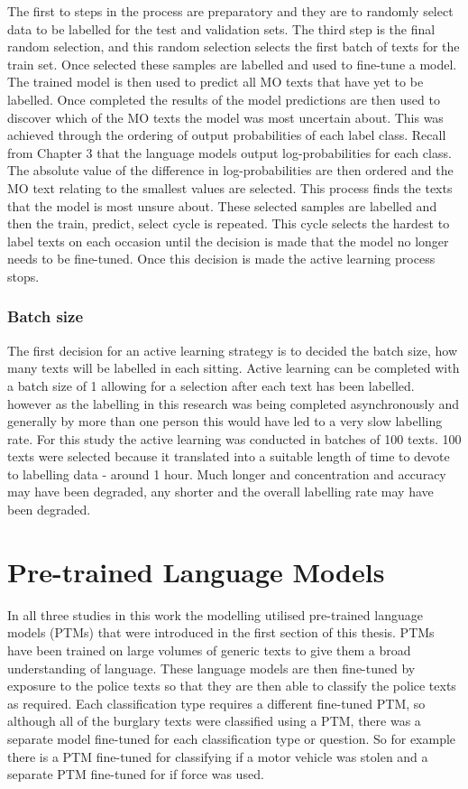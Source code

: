The first to steps in the process are preparatory and they are to randomly select data to be labelled for the test and validation sets. The third step is the final random selection, and this random selection selects the first batch of texts for the train set. Once selected these samples are labelled and used to fine-tune a model. The trained model is then used to predict all MO texts that have yet to be labelled. Once completed the results of the model predictions are then used to discover which of the MO texts the model was most uncertain about. This was achieved through the ordering of output probabilities of each label class. Recall from Chapter 3 that the language models output log-probabilities for each class. The absolute value of the difference in log-probabilities are then ordered and the MO text relating to the smallest values are selected. This process finds the texts that the model is most unsure about. These selected samples are labelled and then the train, predict, select cycle is repeated. This cycle selects the hardest to label texts on each occasion until the decision is made that the model no longer needs to be fine-tuned. Once this decision is made the active learning process stops. 


\subsubsection{Batch size}
The first decision for an active learning strategy is to decided the batch size, how many texts will be labelled in each sitting. Active learning can be completed with a batch size of 1 allowing for a selection after each text has been labelled. however as the labelling in this research was being completed asynchronously and generally by more than one person this would have led to a very slow labelling rate. For this study the active learning was conducted in batches of 100 texts. 100 texts were selected because it translated into a suitable length of time to devote to labelling data - around 1 hour. Much longer and concentration and accuracy may have been degraded, any shorter and the overall labelling rate may have been degraded. 


\section{Pre-trained Language Models} In all three studies in this work the modelling utilised pre-trained language models (PTMs) that were introduced in the first section of this thesis. PTMs have been trained on large volumes of generic texts to give them a broad understanding of language. These language models are then fine-tuned by exposure to the police texts so that they are then able to classify the police texts as required. Each classification type requires a different fine-tuned PTM, so although all of the burglary texts were classified using a PTM, there was a separate model fine-tuned for each classification type or question. So for example there is a PTM fine-tuned for classifying if a motor vehicle was stolen and a separate PTM fine-tuned for if force was used. 

